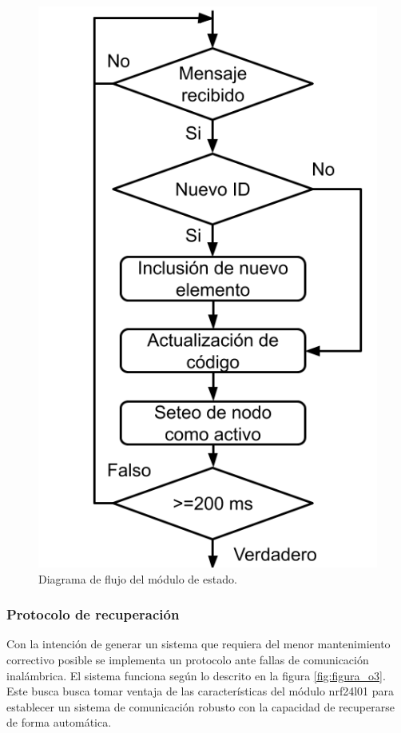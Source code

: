\begin{figure}[]
	\centering
	\includegraphics[scale=.35]{./Figures/Capitulo3/Fig_N3.png}
	\caption{Diagrama de flujo del módulo de estado.}
	\label{fig:figura_n3}
\end{figure}  


\subsubsection{Protocolo de recuperación}

Con la intención de generar un sistema que requiera del menor mantenimiento correctivo posible se implementa un protocolo ante fallas de comunicación inalámbrica. El sistema funciona según lo descrito en la figura \ref{fig:figura_o3}. Este busca busca tomar ventaja de las características del módulo nrf24l01 para establecer un sistema de comunicación robusto con la capacidad de recuperarse de forma automática.

